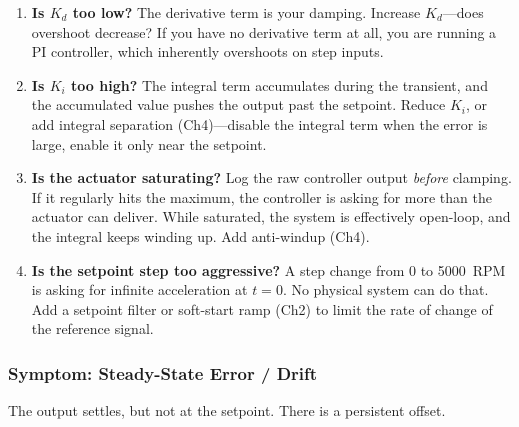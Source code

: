 \begin{enumerate}
    \item \textbf{Is $K_d$ too low?} The derivative term is your damping. Increase $K_d$---does overshoot decrease? If you have no derivative term at all, you are running a PI controller, which inherently overshoots on step inputs.

    \item \textbf{Is $K_i$ too high?} The integral term accumulates during the transient, and the accumulated value pushes the output past the setpoint. Reduce $K_i$, or add integral separation (Ch4)---disable the integral term when the error is large, enable it only near the setpoint.

    \item \textbf{Is the actuator saturating?} Log the raw controller output \textit{before} clamping. If it regularly hits the maximum, the controller is asking for more than the actuator can deliver. While saturated, the system is effectively open-loop, and the integral keeps winding up. Add anti-windup (Ch4).

    \item \textbf{Is the setpoint step too aggressive?} A step change from 0 to 5000~RPM is asking for infinite acceleration at $t=0$. No physical system can do that. Add a setpoint filter or soft-start ramp (Ch2) to limit the rate of change of the reference signal.
\end{enumerate}

\subsubsection{Symptom: Steady-State Error / Drift}

The output settles, but not at the setpoint. There is a persistent offset.

